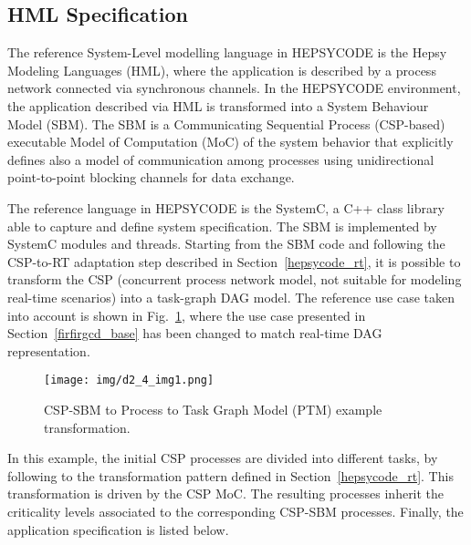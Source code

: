 \subsection{HML Specification}
%
The reference System-Level modelling language in HEPSYCODE is the Hepsy Modeling Languages (HML), where the application is described by a process network connected via synchronous channels. In the HEPSYCODE environment, the application described via HML is transformed into a System Behaviour Model (SBM). The SBM is a Communicating Sequential Process (CSP-based) executable Model of Computation (MoC) of the system behavior that explicitly defines also a model of communication among processes using unidirectional point-to-point blocking channels for data exchange. \par
%
%
The reference language in HEPSYCODE is the SystemC, a C++ class library able to capture and define system specification. The SBM is implemented by SystemC modules and threads. Starting from the SBM code and following the CSP-to-RT adaptation step described in Section~\ref{hepsycode_rt}, it is possible to transform the CSP (concurrent process network model, not suitable for modeling real-time scenarios) into a task-graph DAG model. The reference use case taken into account is shown in Fig.~\ref{xamber_hepcysode_03}, where the use case presented in Section~\ref{firfirgcd_base} has been changed to match real-time DAG representation. \par    
%
\begin{figure}[htbp]
	\centerline{\texttt{[image: img/d2\_4\_img1.png]}}
	\caption{CSP-SBM to Process to Task Graph Model (PTM) example transformation.}
	\label{xamber_hepcysode_03}
\end{figure}
%
In this example, the initial CSP processes are divided into different tasks, by following to the transformation pattern defined in Section~\ref{hepsycode_rt}. This transformation is driven by the CSP MoC. The resulting processes inherit the criticality levels associated to the corresponding CSP-SBM processes. Finally, the application specification is listed below. \par
%
\footnotesize

